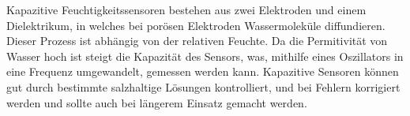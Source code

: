 Kapazitive Feuchtigkeitssensoren bestehen aus zwei Elektroden und einem
Dielektrikum, in welches bei porösen Elektroden Wassermoleküle diffundieren.
Dieser Prozess ist abhängig von der relativen Feuchte. Da die Permitivität von
Wasser hoch ist steigt die Kapazität des Sensors, was, mithilfe eines
Oszillators in eine Frequenz umgewandelt, gemessen werden kann. Kapazitive
Sensoren können gut durch bestimmte salzhaltige Lösungen kontrolliert, und bei
Fehlern korrigiert werden und sollte auch bei längerem Einsatz gemacht
werden.\cite{koch2006neues}